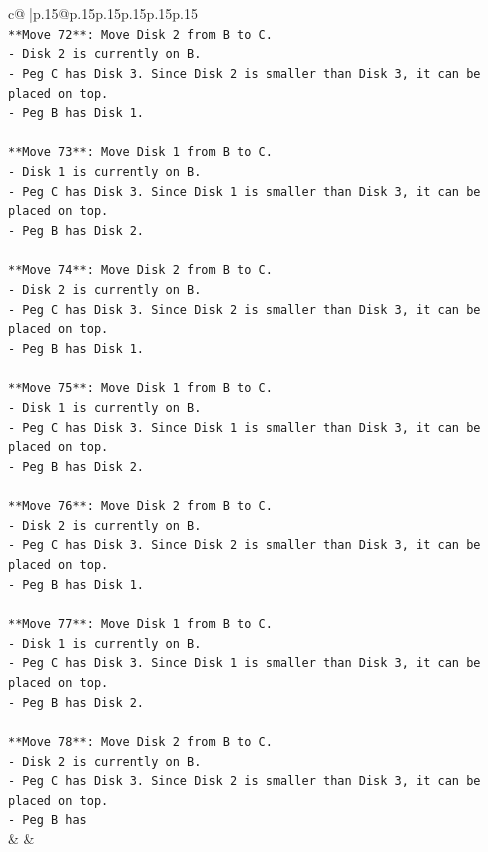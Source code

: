 \documentclass{article}
\begin{document}
{\begin{supertabular}{c@{$\;$}|p{.15\linewidth}@{}p{.15\linewidth}p{.15\linewidth}p{.15\linewidth}p{.15\linewidth}p{.15\linewidth}}
{{{\\ 
\texttt{**Move 72**: Move Disk 2 from B to C.} \\
\texttt{{-} Disk 2 is currently on B.} \\
\texttt{{-} Peg C has Disk 3. Since Disk 2 is smaller than Disk 3, it can be placed on top.} \\
\texttt{{-} Peg B has Disk 1.} \\
\\ 
\texttt{**Move 73**: Move Disk 1 from B to C.} \\
\texttt{{-} Disk 1 is currently on B.} \\
\texttt{{-} Peg C has Disk 3. Since Disk 1 is smaller than Disk 3, it can be placed on top.} \\
\texttt{{-} Peg B has Disk 2.} \\
\\ 
\texttt{**Move 74**: Move Disk 2 from B to C.} \\
\texttt{{-} Disk 2 is currently on B.} \\
\texttt{{-} Peg C has Disk 3. Since Disk 2 is smaller than Disk 3, it can be placed on top.} \\
\texttt{{-} Peg B has Disk 1.} \\
\\ 
\texttt{**Move 75**: Move Disk 1 from B to C.} \\
\texttt{{-} Disk 1 is currently on B.} \\
\texttt{{-} Peg C has Disk 3. Since Disk 1 is smaller than Disk 3, it can be placed on top.} \\
\texttt{{-} Peg B has Disk 2.} \\
\\ 
\texttt{**Move 76**: Move Disk 2 from B to C.} \\
\texttt{{-} Disk 2 is currently on B.} \\
\texttt{{-} Peg C has Disk 3. Since Disk 2 is smaller than Disk 3, it can be placed on top.} \\
\texttt{{-} Peg B has Disk 1.} \\
\\ 
\texttt{**Move 77**: Move Disk 1 from B to C.} \\
\texttt{{-} Disk 1 is currently on B.} \\
\texttt{{-} Peg C has Disk 3. Since Disk 1 is smaller than Disk 3, it can be placed on top.} \\
\texttt{{-} Peg B has Disk 2.} \\
\\ 
\texttt{**Move 78**: Move Disk 2 from B to C.} \\
\texttt{{-} Disk 2 is currently on B.} \\
\texttt{{-} Peg C has Disk 3. Since Disk 2 is smaller than Disk 3, it can be placed on top.} \\
\texttt{{-} Peg B has} \\
            }
        }
    }
    & & \\ \\


\end{supertabular}}
\end{document}
